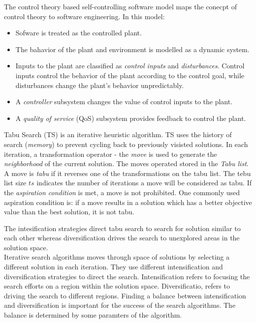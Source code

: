 \documentclass[pdftex,11pt]{article}
\begin{document}
The control theory based self-controlling software model maps the conecpt of control theory to software engineering. In this model:
\begin{itemize}
\item Sofware is treated as the controlled plant.
\item The bahavior of the plant and environment is modelled as a dynamic system.
\item Inputs to the plant are classified as \emph{control inputs} and \emph{disturbances}. Control inputs control the behavior of the plant according to the control goal, while disturbances change the plant's behavior unpredictably.
\item A \emph{controller} subsystem changes the value of control inputs to the plant.
\item A \emph{quality of service} (QoS) subsystem provides feedback to control the plant.
\end{itemize}

Tabu Search (TS) is an iterative heuristic algorithm. TS uses the history of search (\emph{memory}) to prevent cycling back to previously visisted solutions. In each iteration, a transformation operator - the \emph{move} is used to generate the \emph{neighborhood} of the current solution. The moves operated stored in the \emph{Tabu list}. A move is \emph{tabu} if it reverses one of the transformations on the tabu list. The tebu list size $ts$ indicates the number of iterations a move will be considered as tabu. If the \emph{aspiration condition} is met, a move is not prohibited. One commonly used aspiration condition is: if a move results in a solution which has a better objective value than the best solution, it is not tabu.

The intesification strategies direct tabu search to search for solution similar to each other whereas diversification drives the search to unexplored areas in the solution space.\\

Iterative search algorithms moves through space of solutions by selecting a different solution in each iteration. They use different intensification and diversification strategies to direct the search. Intensification refers to focusing the search efforts on a region within the solution space. Diversificatio, refers to driving the search to different regions. Finding a balance between intensification and diversification is important for the success of the search algorithms. The balance is determined by some paramters of the algorithm.
\end{document}
